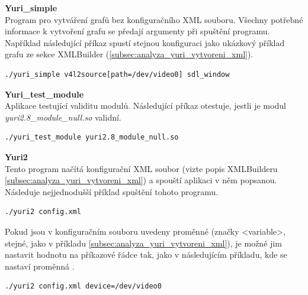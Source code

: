 \documentclass[thesis=M,czech]{FITthesis}[2012/06/26]
\begin{document}
\begin{description}
  \item \textbf{Yuri\_simple\\}
  Program pro vytváření grafů bez konfiguračního XML souboru. Všechny potřebné informace k vytvoření grafu se předají argumenty při spuštění programu. Například následující příkaz spustí stejnou konfiguraci jako ukázkový příklad grafu ze sekce XMLBuilder (\ref{subsec:analyza_yuri_vytvoreni_xml}).\\
  
\begin{lstlisting}
./yuri_simple v4l2source[path=/dev/video0] sdl_window
\end{lstlisting}

  \item \textbf{Yuri\_test\_module\\}
  Aplikace testující validitu modulů. Následující příkaz otestuje, jestli je modul \textit{yuri2.8\_module\_null.so} validní.
\begin{lstlisting}
./yuri_test_module yuri2.8_module_null.so
\end{lstlisting}

  \item \textbf{Yuri2\\}
Tento program načítá konfigurační XML soubor (vizte popis XMLBuilderu \ref{subsec:analyza_yuri_vytvoreni_xml}) a spouští aplikaci v něm popsanou. Následuje nejjednodušší příklad spuštění tohoto programu.\\

\begin{lstlisting}
./yuri2 config.xml
\end{lstlisting}

Pokud jsou v konfiguračním souboru uvedeny proměnné (značky <variable>, stejné, jako v příkladu \ref{subsec:analyza_yuri_vytvoreni_xml}), je možné jim nastavit hodnotu na příkazové řádce tak, jako v následujícím příkladu, kde se nastaví proměnná .\\

\begin{lstlisting}
./yuri2 config.xml device=/dev/video0
\end{lstlisting}


\end{description}
\end{document}
